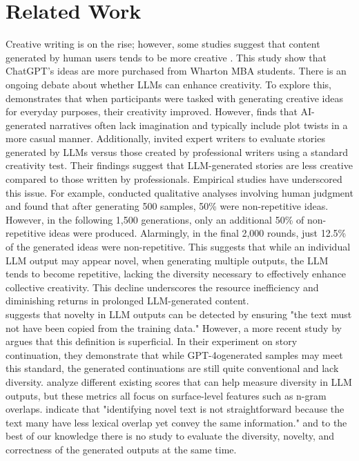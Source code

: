 \section{Related Work}
Creative writing \cite{Kobak2024, lee2024} is on the rise; however, some studies suggest that content generated by human users tends to be more creative \cite{Kefford2023}. This study show that ChatGPT's ideas are more purchased from Wharton MBA students. There is an ongoing debate about whether LLMs can enhance creativity. To explore this, \cite{lee2024} demonstrates that when participants were tasked with generating creative ideas for everyday purposes, their creativity improved. However, \cite{Begus2023} finds that AI-generated narratives often lack imagination and typically include plot twists in a more casual manner. Additionally, \cite{Chakrabarty2024} invited expert writers to evaluate stories generated by LLMs versus those created by professional writers using a standard creativity test. Their findings suggest that LLM-generated stories are less creative compared to those written by professionals.
Empirical studies have underscored this issue. For example, \cite{si2024can} conducted qualitative analyses involving human judgment and found that after generating 500 samples, 50\% were non-repetitive ideas. However, in the following 1,500 generations, only an additional 50\% of non-repetitive ideas were produced. Alarmingly, in the final 2,000 rounds, just 12.5\% of the generated ideas were non-repetitive. This suggests that while an individual LLM output may appear novel, when generating multiple outputs, the LLM tends to become repetitive, lacking the diversity necessary to effectively enhance collective creativity.
This decline underscores the resource inefficiency and diminishing returns in prolonged LLM-generated content. \\
\cite{McCoy2023} suggests that novelty in LLM outputs can be detected by ensuring "the text must not have been copied from the training data." However, a more recent study by \cite{xu2024echoes} argues that this definition is superficial. In their experiment on story continuation, they demonstrate that while GPT-4ogenerated samples may meet this standard, the generated continuations are still quite conventional and lack diversity.
\cite{Shaib2024} analyze different existing scores that can help measure diversity in LLM outputs, but these metrics all focus on surface-level features such as n-gram overlaps. \cite{Ghosal2022} indicate that "identifying novel text is not straightforward because the text many have less lexical overlap yet convey the same information." and to the best of our knowledge there is no study to evaluate the diversity, novelty, and correctness of the generated outputs at the same time.